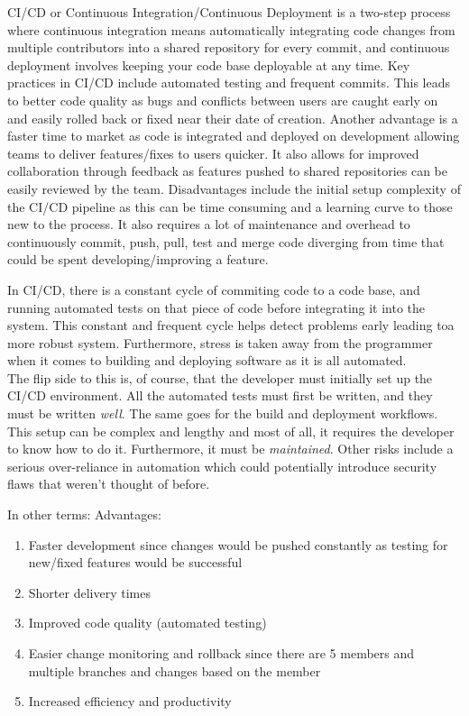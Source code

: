 \documentclass{article}
\begin{document}
    CI/CD or Continuous Integration/Continuous Deployment is a two-step process where continuous integration means automatically 
    integrating code changes from multiple contributors into a shared repository for every commit, and continuous deployment involves 
    keeping your code base deployable at any time.
    Key practices in CI/CD include automated testing and frequent commits. This leads to better code quality as bugs and conflicts between 
    users are caught early on and easily rolled back or fixed near their date of creation. Another advantage is a faster time to market as 
    code is integrated and deployed on development allowing teams to deliver features/fixes to users quicker. It also allows for improved 
    collaboration through feedback as features pushed to shared repositories can be easily reviewed by the team.
    Disadvantages include the initial setup complexity of the CI/CD pipeline as this can be time consuming and a learning curve to those 
    new to the process. It also requires a lot of maintenance and overhead to continuously commit, push, pull, test and merge code diverging
    from time that could be spent developing/improving a feature.

    In CI/CD, there is a constant cycle of commiting code to a code base, and running automated tests on that piece of code before 
    integrating it into the system. This constant and frequent cycle helps detect problems early leading toa more robust system. 
    Furthermore, stress is taken away from the programmer when it comes to building and deploying software as it is all automated.\\
    The flip side to this is, of course, that the developer must initially set up the CI/CD environment. All the automated tests must 
    first be written, and they must be written \textit{well}. The same goes for the build and deployment workflows. This setup can be 
    complex and lengthy and most of all, it requires the developer to know how to do it. Furthermore, it must be \textit{maintained}. 
    Other risks include a serious over-reliance in automation which could potentially introduce security flaws that weren't thought of 
    before.
  
    In other terms:
    Advantages:
    \begin{enumerate}
      \item Faster development since changes would be pushed constantly as testing for new/fixed features would be successful
      \item Shorter delivery times
      \item Improved code quality (automated testing)
      \item Easier change monitoring and rollback since there are 5 members and multiple branches and changes based on the member
      \item Increased efficiency and productivity
    \end{enumerate}
     
\end{document}
